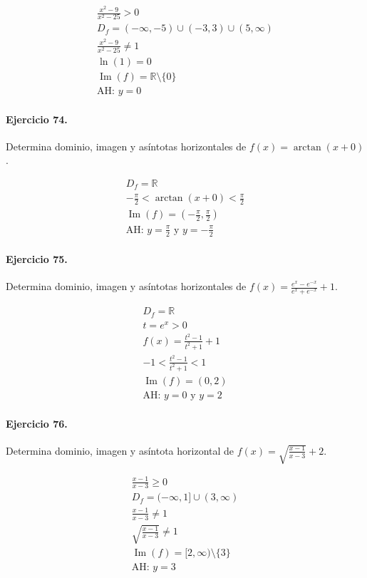 \documentclass[11pt,a4paper]{article}
\begin{document}
\[
\begin{aligned}
\frac{x^2-9}{x^2-25} >0\\
D_f=(-\infty,-5)\cup(-3,3)\cup(5,\infty)\\
\frac{x^2-9}{x^2-25}\ne1\\
\ln(1)=0\\
\operatorname{Im}(f)=\mathbb{R}\setminus\{0\}\\
\text{{AH: }}y=0
\end{aligned}
\]


\paragraph{Ejercicio 74.} Determina dominio, imagen y asíntotas horizontales de $f(x)=\arctan(x+0)$.

\[
\begin{aligned}
D_f=\mathbb{R}\\
-\frac{\pi}{2}<\arctan(x+0)<\frac{\pi}{2}\\
\operatorname{Im}(f)=\left(-\frac{\pi}{2},\frac{\pi}{2}\right)\\
\text{AH: }y=\frac{\pi}{2}\text{ y }y=-\frac{\pi}{2}
\end{aligned}
\]


\paragraph{Ejercicio 75.} Determina dominio, imagen y asíntotas horizontales de $f(x)=\frac{e^x-e^{-x}}{e^x+e^{-x}}+1$.

\[
\begin{aligned}
D_f=\mathbb{R}\\
t=e^x>0\\
f(x)=\frac{t^2-1}{t^2+1}+1\\
-1<\frac{t^2-1}{t^2+1}<1\\
\operatorname{Im}(f)=(0,2)\\
\text{AH: }y=0\text{ y }y=2
\end{aligned}
\]


\paragraph{Ejercicio 76.} Determina dominio, imagen y asíntota horizontal de $f(x)=\sqrt{\frac{x-1}{x-3}}+2$.

\[
\begin{aligned}
\frac{x-1}{x-3}\ge0\\
D_f=(-\infty,1]\cup(3,\infty)\\
\frac{x-1}{x-3}\ne1\\
\sqrt{\frac{x-1}{x-3}}\ne1\\
\operatorname{Im}(f)=[2,\infty)\setminus\{3\}\\
\text{AH: }y=3
\end{aligned}
\]
\end{document}
